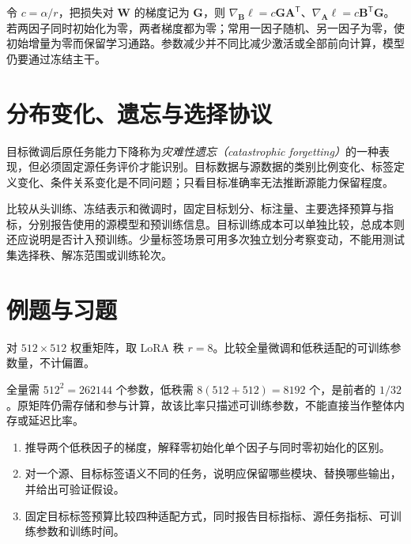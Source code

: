 令 $c=\alpha/r$，把损失对 $\mathbf W$ 的梯度记为 $\mathbf G$，则 $\nabla_{\mathbf B}\ell=c\mathbf G\mathbf A^\mathsf T$、$\nabla_{\mathbf A}\ell=c\mathbf B^\mathsf T\mathbf G$。若两因子同时初始化为零，两者梯度都为零；常用一因子随机、另一因子为零，使初始增量为零而保留学习通路。参数减少并不同比减少激活或全部前向计算，模型仍要通过冻结主干。

\section{分布变化、遗忘与选择协议}
目标微调后原任务能力下降称为\emph{灾难性遗忘（catastrophic forgetting）}的一种表现，但必须固定源任务评价才能识别。目标数据与源数据的类别比例变化、标签定义变化、条件关系变化是不同问题；只看目标准确率无法推断源能力保留程度。

比较从头训练、冻结表示和微调时，固定目标划分、标注量、主要选择预算与指标，分别报告使用的源模型和预训练信息。目标训练成本可以单独比较，总成本则还应说明是否计入预训练。少量标签场景可用多次独立划分考察变动，不能用测试集选择秩、解冻范围或训练轮次。

\section{例题与习题}
\begin{example}[低秩适配的参数量]
对 $512\times512$ 权重矩阵，取 LoRA 秩 $r=8$。比较全量微调和低秩适配的可训练参数量，不计偏置。
\end{example}
\begin{solve}
全量需 $512^2=262144$ 个参数，低秩需 $8(512+512)=8192$ 个，是前者的 $1/32$。原矩阵仍需存储和参与计算，故该比率只描述可训练参数，不能直接当作整体内存或延迟比率。
\end{solve}
\begin{enumerate}
\item 推导两个低秩因子的梯度，解释零初始化单个因子与同时零初始化的区别。
\item 对一个源、目标标签语义不同的任务，说明应保留哪些模块、替换哪些输出，并给出可验证假设。
\item 固定目标标签预算比较四种适配方式，同时报告目标指标、源任务指标、可训练参数和训练时间。
\end{enumerate}

